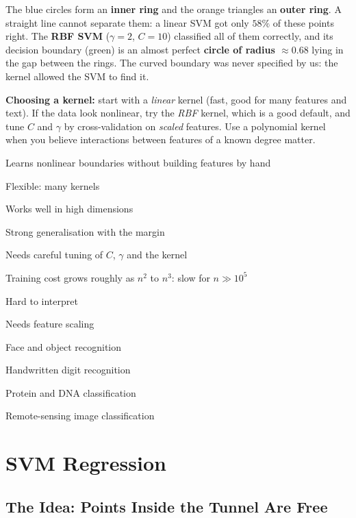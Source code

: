 \begin{explain}
The blue circles form an \textbf{inner ring} and the orange triangles an \textbf{outer ring}. A straight line cannot separate them: a linear SVM got only $58\%$ of these points right. The \textbf{RBF SVM} ($\gamma=2$, $C=10$) classified all of them correctly, and its decision boundary (green) is an almost perfect \textbf{circle of radius $\approx0.68$} lying in the gap between the rings. The curved boundary was never specified by us: the kernel allowed the SVM to find it.
\end{explain}

\begin{keyidea}
\textbf{Choosing a kernel:} start with a \emph{linear} kernel (fast, good for many features and text). If the data look nonlinear, try the \emph{RBF} kernel, which is a good default, and tune $C$ and $\gamma$ by cross-validation on \emph{scaled} features. Use a polynomial kernel when you believe interactions between features of a known degree matter.
\end{keyidea}

{\item Learns nonlinear boundaries without building features by hand
 \item Flexible: many kernels
 \item Works well in high dimensions
 \item Strong generalisation with the margin}
{\item Needs careful tuning of $C$, $\gamma$ and the kernel
 \item Training cost grows roughly as $n^2$ to $n^3$: slow for $n\gg10^5$
 \item Hard to interpret
 \item Needs feature scaling}
{\item Face and object recognition
 \item Handwritten digit recognition
 \item Protein and DNA classification
 \item Remote-sensing image classification}

\section{SVM Regression}

\subsection{The Idea: Points Inside the Tunnel Are Free}

